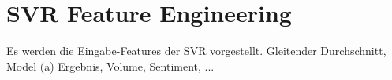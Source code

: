 \chapter{SVR Feature Engineering}\label{app:svr_features}
Es werden die Eingabe-Features der \ac{SVR} vorgestellt.
Gleitender Durchschnitt, Model (a) Ergebnis, Volume, Sentiment, ...